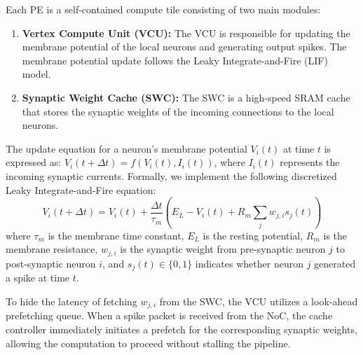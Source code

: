 Each PE is a self-contained compute tile consisting of two main modules:
\begin{enumerate}
  \item \textbf{Vertex Compute Unit (VCU):} The VCU is responsible for updating the membrane potential of the local neurons and generating output spikes. The membrane potential update follows the Leaky Integrate-and-Fire (LIF) model.
  \item \textbf{Synaptic Weight Cache (SWC):} The SWC is a high-speed SRAM cache that stores the synaptic weights of the incoming connections to the local neurons.
\end{enumerate}

The update equation for a neuron's membrane potential $V_i(t)$ at time $t$ is expressed as:
$V_i(t + \Delta t) = f(V_i(t), I_i(t))$, where $I_i(t)$ represents the incoming synaptic currents. Formally, we implement the following discretized Leaky Integrate-and-Fire equation:
\begin{equation}
  V_i(t + \Delta t) = V_i(t) + \frac{\Delta t}{\tau_m} \left( E_L - V_i(t) + R_m \sum_{j} w_{j,i} s_j(t) \right)
  \label{eq:membrane_potential}
\end{equation}
where $\tau_m$ is the membrane time constant, $E_L$ is the resting potential, $R_m$ is the membrane resistance, $w_{j,i}$ is the synaptic weight from pre-synaptic neuron $j$ to post-synaptic neuron $i$, and $s_j(t) \in \{0, 1\}$ indicates whether neuron $j$ generated a spike at time $t$.

To hide the latency of fetching $w_{j,i}$ from the SWC, the VCU utilizes a look-ahead prefetching queue. When a spike packet is received from the NoC, the cache controller immediately initiates a prefetch for the corresponding synaptic weights, allowing the computation to proceed without stalling the pipeline.
